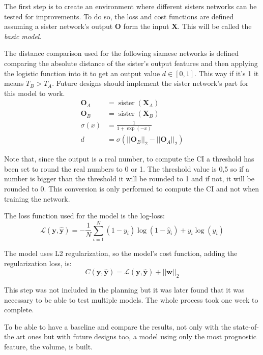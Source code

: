 \label{sec:basic-siamese}

The first step is to create an environment where different sisters networks can be tested
for improvements. To do so, the loss and cost functions are defined assuming a sister
network's output \( \bm{O} \) form the input \( \bm{X} \). This will be called the
\emph{basic model}.

The distance comparison used for the following siamese networks is defined comparing the 
absolute distance of the sister's output features and then applying the logistic function 
into it to get an output value \( d \in [0, 1] \). This way if it's 1 it means \( T_B > T_A \).
Future designs should implement the sister network's part for this model to work.
\begin{align*}
  \bm{O}_A &= \operatorname{sister}(\bm{X}_A) \\
  \bm{O}_B &= \operatorname{sister}(\bm{X}_B) \\
  \sigma(x) &= \frac{1}{1 + \exp(-x)} \\
  d &= \sigma(||\bm{O}_B||_2 - ||\bm{O}_A||_2) 
\end{align*}

Note that, since the output is a real number, to compute the \gls{CI} a threshold has been
set to round the real numbers to 0 or 1. The threshold value is 0,5 so if a number is 
bigger than the threshold it will be rounded to 1 and if not, it will be rounded to 0.
This conversion is only performed to compute the \gls{CI} and not when training the network.

The loss function used for the model is the log-loss:
\[
  \mathcal{L}(\bm{y}, \hat{\bm{y}}) = -\frac{1}{N} \sum_{i = 1}^{N}
  (1 - y_i)\log(1 - \hat{y}_i) + y_i\log(\hat{y}_i)
\]

The model uses L2 regularization, so the model's cost function, 
adding the regularization loss, is:
\[
  C(\bm{y}, \hat{\bm{y}}) = \mathcal{L}(\bm{y}, \hat{\bm{y}}) + 
  ||\bm{w}||_2
\]

This step was not included in the planning but it was later found that it was necessary to be 
able to test multiple models. The whole process took one week to complete.


To be able to have a baseline and compare the results, not only with the state-of-the art ones
but with future designs too, a model using only the most prognostic feature, the volume, is 
built.

